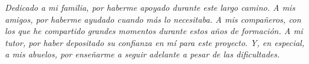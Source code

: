 \begin{flushright}
\textit{Dedicado a mi familia, por haberme apoyado durante este largo camino.
A mis amigos, por haberme ayudado cuando más lo necesitaba.
A mis compañeros, con los que he compartido grandes momentos durante estos años de formación.
A mi tutor, por haber depositado su confianza en mí para este proyecto.
Y, en especial, a mis abuelos, por enseñarme a seguir adelante a pesar de las dificultades.}
\end{flushright}
\newpage
\thispagestyle{empty}
\hspace*{0.5cm}
\newpage